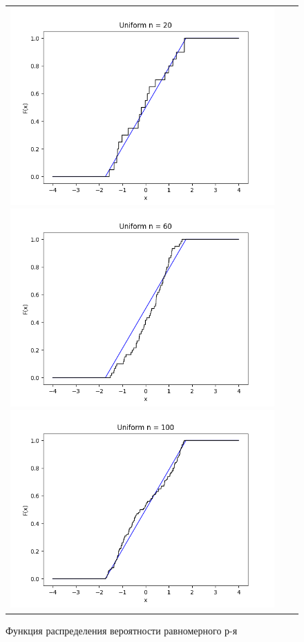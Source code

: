 \begin{figure}[H]
	\begin{tabular}{ccc}
		\includegraphics[scale=0.33]{uniform_F20.png}
		\includegraphics[scale=0.33]{uniform_F60.png}
		\includegraphics[scale=0.33]{uniform_F100.png}
	\end{tabular}
	\caption{Функция распределения вероятности равномерного р-я}
\end{figure}

